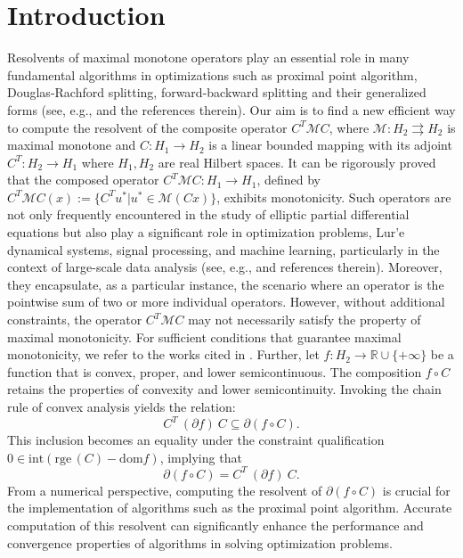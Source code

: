 \documentclass[11pt]{article}
\theoremstyle{plain}
\newcommand{\tcr}{\textcolor{red}}
\begin{document}
\section{Introduction}
Resolvents of maximal monotone operators play an essential role in many fundamental algorithms in optimizations such as proximal point algorithm, Douglas-Rachford splitting, forward-backward splitting and their generalized forms (see, e.g., \cite{Attouch0, Attouch1,Bauschke,Tseng} and the references therein).  
Our aim is to find a new efficient way to compute the resolvent of the composite operator $C^T\mathcal{M}C$,  where $\mathcal{M}: H_2 \rightrightarrows H_2$ is  maximal monotone and $C: H_1\to H_2$ is a linear bounded mapping with its adjoint $C^T: H_2 \to H_1$ where $H_1, H_2$ are  real Hilbert spaces. %
 {
  It can be rigorously proved that the composed operator \( C^T\mathcal{M}C : H_1 \to H_1 \), defined by \( C^T\mathcal{M}C(x) := \{C^Tu^* | u^* \in \mathcal{M}(Cx)\} \), exhibits monotonicity. Such operators are not only frequently encountered in the study of elliptic partial differential equations but also play a significant role in optimization problems, Lur'e dynamical systems, signal processing, and machine learning, particularly in the context of large-scale data analysis (see, e.g., \cite{ahl2,Brezis,br0,BT,chen,Micchelli,Micchelli1,Moudafi,L1} and references therein). Moreover, they encapsulate, as a particular instance, the scenario where an operator is the pointwise sum of two or more individual operators. However, without additional constraints, the operator \( C^T\mathcal{M}C \) may not necessarily satisfy the property of maximal monotonicity. For sufficient conditions that guarantee maximal monotonicity, we refer to the works cited in \cite{Zalinescu}.
Further, let \( f : H_2 \to \mathbb{R}\cup\{+\infty\} \) be a function that is convex, proper, and lower semicontinuous.  The composition \( f \circ C \) retains the properties of convexity and lower semicontinuity. Invoking the chain rule of convex analysis yields the relation:
\[
C^T\:(\partial f)\:C\subseteq \partial (f \circ C).
\]
This inclusion becomes an equality under the constraint qualification \( 0 \in \text{int}(\text{rge}\, (C) - \text{dom} f) \), implying that
\[
\partial (f \circ C) = C^T\:(\partial f)\:C.
\]
From a numerical perspective, computing the resolvent of \( \partial (f \circ C) \) is crucial for the implementation of algorithms such as the proximal point algorithm. Accurate computation of this resolvent can significantly enhance the performance and convergence properties of  algorithms in solving optimization problems.}
\end{document}
